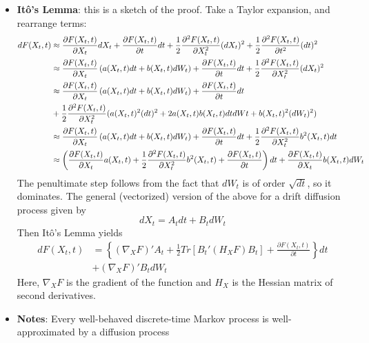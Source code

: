 \documentclass[12pt]{article}
\begin{document}
\begin{itemize}
    \item \textbf{Itô's Lemma}: this is a sketch of the proof. Take a Taylor expansion, and rearrange terms:
    \[\begin{split}
        dF(X_t, t) &\approx \frac{\partial F(X_t,t)}{\partial X_t}dX_t + \frac{\partial F(X_t,t)}{\partial t}dt + \frac{1}{2}\frac{\partial^2 F(X_t,t)}{\partial X_t^2}(dX_t)^2 + \frac{1}{2}\frac{\partial^2 F(X_t,t)}{\partial t^2}(dt)^2 \\
        &\approx \frac{\partial F(X_t,t)}{\partial X_t}\left(a(X_t,t)dt + b(X_t,t)dW_t\right) + \frac{\partial F(X_t,t)}{\partial t}dt + \frac{1}{2}\frac{\partial^2 F(X_t,t)}{\partial X_t^2}(dX_t)^2 \\
        &\approx \frac{\partial F(X_t,t)}{\partial X_t}\left(a(X_t,t)dt + b(X_t,t)dW_t\right) + \frac{\partial F(X_t,t)}{\partial t}dt \\
        \hspace{4mm}&+ \frac{1}{2}\frac{\partial^2 F(X_t,t)}{\partial X_t^2}(a(X_t,t)^2(dt)^2 + 2a(X_t,t)b(X_t,t)dtdWt + b(X_t,t)^2(dW_t)^2) \\
        &\approx \frac{\partial F(X_t,t)}{\partial X_t}\left(a(X_t,t)dt + b(X_t,t)dW_t\right) + \frac{\partial F(X_t,t)}{\partial t}dt + \frac{1}{2}\frac{\partial^2 F(X_t,t)}{\partial X_t^2} b^2(X_t,t)dt \\
        &\approx \left(\frac{\partial F(X_t,t)}{\partial X_t}a(X_t,t) + \frac{1}{2}\frac{\partial^2 F(X_t,t)}{\partial X_t^2} b^2(X_t,t) + \frac{\partial F(X_t,t)}{\partial t}\right)dt + \frac{\partial F(X_t,t)}{\partial X_t}b(X_t,t)dW_t
    \end{split}\]
    The penultimate step follows from the fact that $dW_t$ is of order $\sqrt{dt}$, so it dominates. The general (vectorized) version of the above for a drift diffusion process given by
    \[dX_t = A_t dt + B_t dW_t\]
    Then Itô's Lemma yields
    \[\begin{split}
        dF(X_t,t) &= \left\{\left(\nabla_X F\right)'A_t + \frac{1}{2}Tr[B_t'(H_XF)B_t] + \frac{\partial F(X_t,t)}{\partial t}\right\}dt \\
        &+ \left(\nabla_XF\right)'B_tdW_t
    \end{split}\]
    Here, $\nabla_XF$ is the gradient of the function and $H_X$ is the Hessian matrix of second derivatives.
    \item \textbf{Notes}: Every well-behaved discrete-time Markov process is well-approximated by a diffusion process
\end{itemize}
\end{document}
